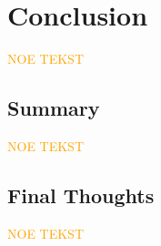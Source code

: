 \chapter{Conclusion}

\textcolor{orange}{NOE TEKST}
\begin{comment}
    FRA PRESENTASJON OM KONKLUSJON:
    1. Gå tilbake til temaet
    2. Gjenoppgi hovedpåstanden eller gjenta problemstillingen
    3. Oppsummering av ideene som er diskutert
    4. Oppsummerende sluttpoeng:
        - Forsterke hovedbudskapet
        - Gi en tankevekker eller refleksjon
        - Peke på videre implikasjoner
\end{comment}

\section{Summary}

\textcolor{orange}{NOE TEKST}

\section{Final Thoughts}

\textcolor{orange}{NOE TEKST}
